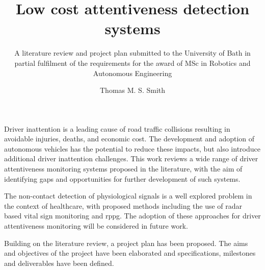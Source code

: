 \documentclass[11pt, parskip=half*,twoside=false]{scrbook}
\title{Low cost attentiveness detection systems}
\author{Thomas M. S. Smith}
\subtitle{A literature review and project plan submitted to the University of Bath in partial fulfilment of the requirements for the award of MSc in Robotics and Autonomous Engineering}
\begin{document}
\maketitle

\frontmatter


%
%


Driver inattention is a leading cause of road traffic collisions resulting in avoidable injuries, deaths, and economic cost.
The development and adoption of autonomous vehicles has the potential to reduce these impacts, but also introduce additional driver inattention challenges. This work reviews a wide range of driver attentiveness monitoring systems proposed in the literature, with the aim of identifying gaps and opportunities for further development of such systems.

The non-contact detection of physiological signals is a well explored problem in the context of healthcare, with proposed methods including the use of radar based vital sign monitoring and \gls{rppg}. The adoption of these approaches for driver attentiveness monitoring will be considered in future work.

Building on the literature review, a project plan has been proposed. The aims and objectives of the project have been elaborated and specifications, milestones and deliverables have been defined.

\tableofcontents

\printnoidxglossary[sort=letter, title={List of Abbreviations}]
\end{document}
